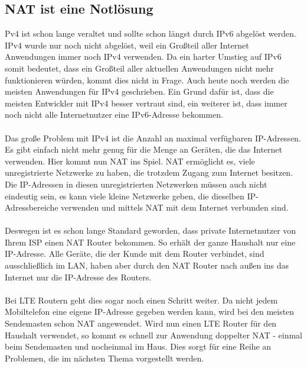\subsection{NAT ist eine Notlösung}
Pv4 ist schon lange veraltet und sollte schon längst durch IPv6 abgelöst werden. IPv4 wurde nur noch nicht abgelöst, weil ein Großteil aller Internet Anwendungen immer noch IPv4 verwenden. Da ein harter Umstieg auf IPv6 somit bedeutet, dass ein Großteil aller aktuellen Anwendungen nicht mehr funktionieren würden, kommt dies nicht in Frage. Auch heute noch werden die meisten Anwendungen für IPv4 geschrieben. Ein Grund dafür ist, dass die meisten Entwickler mit IPv4 besser vertraut sind, ein weiterer ist, dass immer noch nicht alle Internetnutzer eine IPv6-Adresse bekommen.
\\\\
Das große Problem mit IPv4 ist die Anzahl an maximal verfügbaren IP-Adressen. Es gibt einfach nicht mehr genug für die Menge an Geräten, die das Internet verwenden. 
Hier kommt nun NAT ins Spiel. NAT ermöglicht es, viele unregistrierte Netzwerke zu haben, die trotzdem Zugang zum Internet besitzen. Die IP-Adressen in diesen unregistrierten Netzwerken müssen auch nicht eindeutig sein, es kann viele kleine Netzwerke geben, die dieselben IP-Adressbereiche verwenden und mittels NAT mit dem Internet verbunden sind.
\\\\
Deswegen ist es schon lange Standard geworden, dass private Internetnutzer von Ihrem ISP einen NAT Router bekommen. So erhält der ganze Haushalt nur eine IP-Adresse. Alle Geräte, die der Kunde mit dem Router verbindet, sind ausschließlich im LAN, haben aber durch den NAT Router nach außen ins das Internet nur die IP-Adresse des Routers. 
\\\\
Bei LTE Routern geht dies sogar noch einen Schritt weiter. Da nicht jedem Mobiltelefon eine eigene IP-Adresse gegeben werden kann, wird bei den meisten Sendemasten schon NAT angewendet. Wird nun einen LTE Router für den Haushalt verwendet, so kommt es schnell zur Anwendung doppelter NAT - einmal beim Sendemasten und nocheinmal im Haus. Dies sorgt für eine Reihe an Problemen, die im nächsten Thema vorgestellt werden. 

